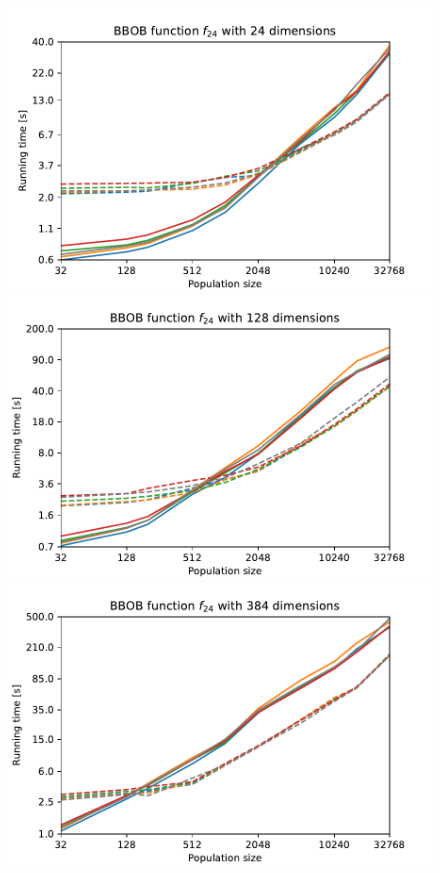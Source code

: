 \begin{figure}[ht!]
    \begin{minipage}[t]{0.32\textwidth}
        \centering
        \includegraphics[width=\textwidth]{img/runs/time_es_crossover_fn24_24d.pdf}
    \end{minipage}
    \hfill
    \begin{minipage}[t]{0.32\textwidth}
        \centering
        \includegraphics[width=\textwidth]{img/runs/time_es_crossover_fn24_128d.pdf}
    \end{minipage}
    \hfill
    \begin{minipage}[t]{0.32\textwidth}
        \centering
        \includegraphics[width=\textwidth]{img/runs/time_es_crossover_fn24_384d.pdf}
    \end{minipage}


\end{figure}
